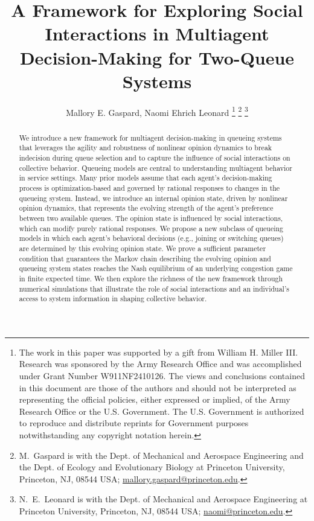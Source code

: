 \documentclass[conference]{IEEEtran}
\begin{document}
\title{\LARGE
A Framework for Exploring Social Interactions in Multiagent Decision-Making for Two-Queue Systems
}

\author{Mallory E. Gaspard, Naomi Ehrich Leonard%
\thanks{The work in this paper was supported by a gift from William H. Miller III. Research was sponsored by the Army Research Office and was accomplished under Grant Number W911NF2410126. The views and conclusions contained in this document are those of the authors and should not be interpreted as representing the official policies, either expressed or implied, of the Army Research Office or the U.S. Government. The U.S. Government is authorized to reproduce and distribute reprints for Government purposes notwithstanding any copyright notation herein.}%
\thanks{M.~Gaspard is with the Dept. of Mechanical and
Aerospace Engineering and the Dept. of Ecology and Evolutionary Biology at Princeton University, Princeton, NJ, 08544 USA; \href{mailto:mallory.gaspard@princeton.edu}{mallory.gaspard@princeton.edu}.}%
\thanks{N.~E.~Leonard is with the Dept. of Mechanical and
Aerospace Engineering at Princeton University, Princeton, NJ, 08544 USA; \href{mailto:naomi@princeton.edu}{naomi@princeton.edu}. }%
}

\maketitle


\maketitle

\begin{abstract}
We introduce a new framework for multiagent decision-making in queueing systems that leverages the agility and robustness of nonlinear opinion dynamics to break indecision during queue selection and to capture the influence of social interactions on collective behavior. Queueing models are central to understanding multiagent behavior in service settings. Many prior models assume that each agent's decision-making process is optimization-based and governed by rational responses to changes in the queueing system. Instead, we introduce an internal opinion state, driven by nonlinear opinion dynamics, that represents the evolving strength of the agent's preference between two available queues. The opinion state is influenced by social interactions, which can modify purely rational responses. We propose a new subclass of queueing models in which each agent's behavioral decisions (e.g., joining or switching queues) are determined by this evolving opinion state. 
We prove a sufficient parameter condition that guarantees the Markov chain describing the evolving opinion and queueing system states reaches the Nash equilibrium of an underlying congestion game in finite expected time. We then explore the richness of the new framework through numerical simulations that illustrate the role of social interactions and an individual's access to system information in shaping collective behavior.
\end{abstract}
\end{document}
